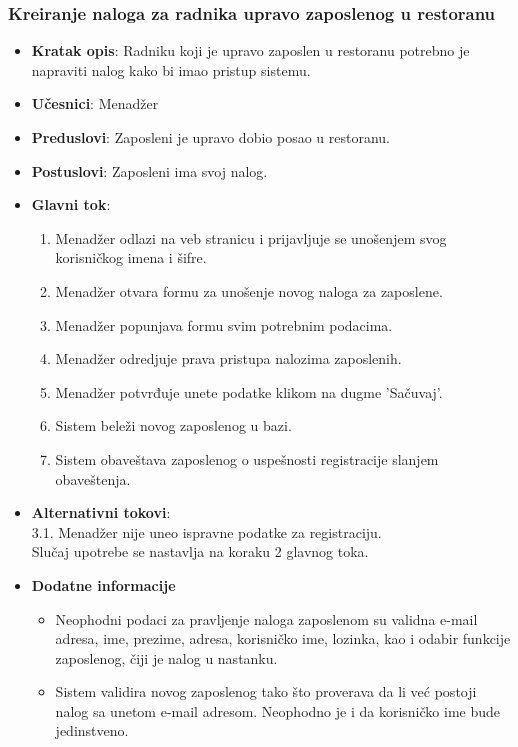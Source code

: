  \subsubsection{Kreiranje naloga za radnika upravo zaposlenog u restoranu}
 
\begin{itemize}
    \item \textbf{Kratak opis}:
   Radniku koji je upravo zaposlen u restoranu potrebno je napraviti nalog kako bi imao pristup sistemu.
    \item \textbf{Učesnici}:
    Menadžer
    \item \textbf{Preduslovi}:
    Zaposleni je upravo dobio posao u restoranu.
    \item \textbf{Postuslovi}:
    Zaposleni ima svoj nalog. 
    \item \textbf{Glavni tok}:
   \begin{enumerate}
        \item Menadžer odlazi na veb stranicu i prijavljuje se unošenjem svog korisničkog imena i šifre.
        \item Menadžer otvara formu za unošenje novog naloga za zaposlene.
        \item Menadžer popunjava formu svim potrebnim podacima.
        \item Menadžer odredjuje prava pristupa nalozima zaposlenih.
        \item Menadžer potvrđuje unete podatke klikom na dugme 'Sačuvaj'.
        \item Sistem beleži novog zaposlenog u bazi.
        \item Sistem obaveštava zaposlenog o uspešnosti registracije slanjem obaveštenja.
\end{enumerate}
\end{itemize}
\begin {itemize}
\item \textbf {Alternativni tokovi}:\\
 3.1. Menadžer nije uneo ispravne podatke za registraciju.\\
 Slučaj upotrebe se nastavlja na koraku 2 glavnog toka.
 \end{itemize}
 \begin{itemize} 
     \item \textbf{Dodatne informacije}
 \begin{itemize}
     \item Neophodni podaci za pravljenje naloga zaposlenom su validna e-mail adresa, ime, prezime, adresa, korisničko ime, lozinka, kao i odabir funkcije zaposlenog, čiji je nalog u nastanku.
    \item Sistem validira novog zaposlenog tako što proverava da li već postoji nalog sa unetom e-mail adresom. Neophodno je i da korisničko ime bude jedinstveno.
 \end{itemize}
 \end{itemize}

